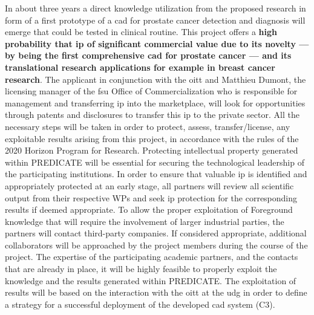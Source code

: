 In about three years a direct knowledge utilization from the proposed research in form of a first prototype of a \ac{cad} for prostate cancer detection and diagnosis will emerge that could be tested in clinical routine.
This project offers a \textbf{high probability that \ac{ip} of significant commercial value due to its novelty --- by being the first comprehensive \ac{cad} for prostate cancer --- and its translational research applications for example in breast cancer research}.
The applicant in conjunction with the \ac{oitt} and Matthieu Dumont, the licensing manager of the \ac{fsu} Office of Commercialization who is responsible for management and transferring \ac{ip} into the marketplace, will look for opportunities through patents and disclosures to transfer this \ac{ip} to the private sector.
All the necessary steps will be taken in order to protect, assess, transfer/license, any exploitable results arising from this project, in accordance with the rules of the 2020 Horizon Program for Research.
Protecting intellectual property generated within PREDICATE will be essential for securing the technological leadership of the participating institutions.
In order to ensure that valuable \ac{ip} is identified and appropriately protected at an early stage, all partners will review all scientific output from their respective WPs and seek \ac{ip} protection for the corresponding results if deemed appropriate.
To allow the proper exploitation of Foreground knowledge that will require the involvement of larger industrial parties, the partners will contact third-party companies.
If considered appropriate, additional collaborators will be approached by the project members during the course of the project.
The expertise of the participating academic partners, and the contacts that are already in place, it will be highly feasible to properly exploit the knowledge and the results generated within PREDICATE.
The exploitation of results will be based on the interaction with the \ac{oitt} at the \ac{udg} in order to define a strategy for a successful deployment of the developed \ac{cad} system (C3).





